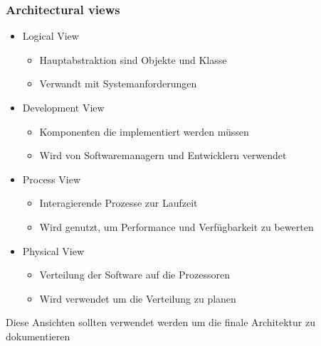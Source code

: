 \subsubsection{Architectural views}
\begin{itemize}
	\item Logical View
		\begin{itemize}
			\item Hauptabstraktion sind Objekte und Klasse
			\item Verwandt mit Systemanforderungen  
		\end{itemize}
	\item Development View
		\begin{itemize}
			\item Komponenten die implementiert werden müssen
			\item Wird von Softwaremanagern und Entwicklern verwendet
		\end{itemize}
	\item Process View
		\begin{itemize}
			\item Interagierende Prozesse zur Laufzeit
			\item Wird genutzt, um Performance und Verfügbarkeit zu bewerten
		\end{itemize}
	\item Physical View
		\begin{itemize}
			\item Verteilung der Software auf die Prozessoren
			\item Wird verwendet um die Verteilung zu planen
		\end{itemize}
\end{itemize}
Diese Ansichten sollten verwendet werden um die finale Architektur zu dokumentieren
